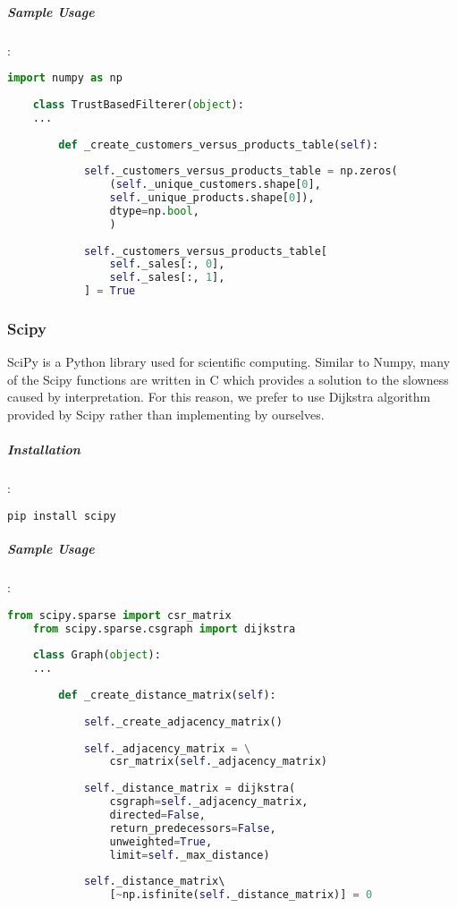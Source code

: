 	\subparagraph{Sample Usage}:
	\begin{lstlisting}[language=python, caption=Numpy example]
	import numpy as np
	
	class TrustBasedFilterer(object):
	...
	
		def _create_customers_versus_products_table(self):
	
			self._customers_versus_products_table = np.zeros(
				(self._unique_customers.shape[0],
				self._unique_products.shape[0]),
				dtype=np.bool,
				)
	
			self._customers_versus_products_table[
				self._sales[:, 0],
				self._sales[:, 1],
			] = True
	\end{lstlisting}
	
	\subsubsection{Scipy \cite{Scipy}}
	SciPy is a Python library used for scientific computing. Similar to Numpy, many of the Scipy functions are written in C which provides a solution to the slowness caused by interpretation. For this reason, we prefer to use Dijkstra algorithm provided by Scipy rather than implementing by ourselves.
	\subparagraph{Installation}:
	\begin{lstlisting}[language=bash]
	pip install scipy
	\end{lstlisting}
	
	\subparagraph{Sample Usage}:
	\begin{lstlisting}[language=python, caption=Scipy example]
	from scipy.sparse import csr_matrix
	from scipy.sparse.csgraph import dijkstra
	
	class Graph(object):
	...
	
		def _create_distance_matrix(self):
	
			self._create_adjacency_matrix()
	
			self._adjacency_matrix = \
				csr_matrix(self._adjacency_matrix)
	
			self._distance_matrix = dijkstra( 
				csgraph=self._adjacency_matrix, 
				directed=False, 
				return_predecessors=False, 
				unweighted=True,
				limit=self._max_distance)
	
			self._distance_matrix\ 
				[~np.isfinite(self._distance_matrix)] = 0
	\end{lstlisting}